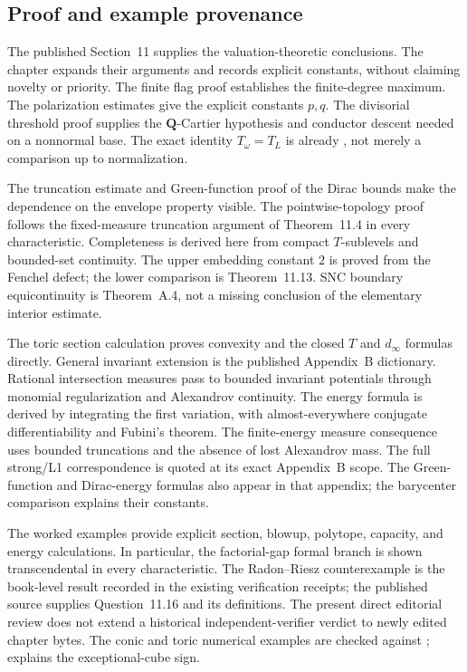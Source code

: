 \subsection{Proof and example provenance}
\label{sec:ch49-additions}

The published Section~11 supplies the valuation-theoretic conclusions.
The chapter expands their arguments and records explicit constants,
without claiming novelty or priority.  The finite flag proof
 establishes the finite-degree maximum.
The polarization estimates give the explicit constants $p,q$.
The divisorial threshold proof supplies the $\mathbf Q$-Cartier
hypothesis and conductor descent needed on a nonnormal base.
The exact identity $T_\omega=T_L$ is already
\cite[Lemma~4.46]{BJ22}, not merely a comparison up to normalization.

The truncation estimate and Green-function proof of the Dirac bounds
make the dependence on the envelope property visible.
The pointwise-topology proof follows the fixed-measure truncation
argument of Theorem~11.4 in every characteristic.
Completeness is derived here from compact $T$-sublevels and bounded-set
continuity.  The upper embedding constant $2$ is proved from the
Fenchel defect; the lower comparison is Theorem~11.13.
SNC boundary equicontinuity is Theorem~A.4, not a missing conclusion
of the elementary interior estimate.

The toric section calculation proves convexity and the closed
$T$ and $d_\infty$ formulas directly.  General invariant extension
is the published Appendix~B dictionary.
Rational intersection measures pass to bounded invariant potentials
through monomial regularization and Alexandrov continuity.
The energy formula is derived by integrating the first variation,
with almost-everywhere conjugate differentiability and Fubini's theorem.
The finite-energy measure consequence uses bounded truncations and
the absence of lost Alexandrov mass.  The full strong/L1 correspondence
is quoted at its exact Appendix~B scope.
The Green-function and Dirac-energy formulas also appear in that
appendix; the barycenter comparison explains their constants.

The worked examples provide explicit section, blowup, polytope,
capacity, and energy calculations.  In particular, the factorial-gap
formal branch is shown transcendental in every characteristic.
The Radon--Riesz counterexample
 is the book-level
result recorded in the existing verification receipts; the published
source supplies Question~11.16 and its definitions.
The present direct editorial review does not extend a historical
independent-verifier verdict to newly edited chapter bytes.
The conic and toric numerical examples are checked against
;
 explains the exceptional-cube sign.

